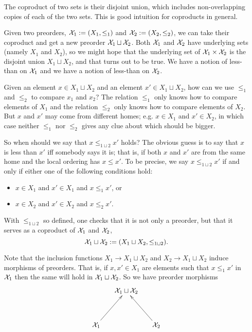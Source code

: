 \documentclass[CT4S-EN-RU]{subfiles}
\begin{document}
\begin{exampleRUS}\label{ex:[1]x[1]}
\end{exampleRUS}


\subsubsection{}

\begin{blockENG}
The coproduct of two sets is their disjoint union, which includes non-overlapping copies of each of the two sets. This is good intuition for coproducts in general.
\end{blockENG}

\begin{blockRUS}
\end{blockRUS}

\begin{exampleENG}
Given two preorders, $\mathcal{X}_1:=(X_1,\leq_1)$ and $\mathcal{X}_2:=(X_2,\leq_2)$, we can take their coproduct and get a new preorder $\mathcal{X}_1\sqcup\mathcal{X}_2$. Both $\mathcal{X}_1$ and $\mathcal{X}_2$ have underlying sets (namely $X_1$ and $X_2$), so we might hope that the underlying set of $\mathcal{X}_1\times\mathcal{X}_2$ is the disjoint union $X_1\sqcup X_2$, and that turns out to be true. We have a notion of less-than on $\mathcal{X}_1$ and we have a notion of less-than on $\mathcal{X}_2$. 

Given an element $x\in X_1\sqcup X_2$ and an element $x'\in X_1\sqcup X_2$, how can we use $\leq_1$ and $\leq_2$ to compare $x_1$ and $x_2$? The relation $\leq_1$ only knows how to compare elements of $X_1$ and the relation $\leq_2$ only knows how to compare elements of $X_2$. But $x$ and $x'$ may come from different homes; e.g. $x\in X_1$ and $x'\in X_2$, in which case neither $\leq_1$ nor $\leq_2$ gives any clue about which should be bigger. 

So when should we say that $x\leq_{1\sqcup 2} x'$ holds? The obvious guess is to say that $x$ is less than $x'$ iff somebody says it is; that is, if both $x$ and $x'$ are from the same home and the local ordering has $x\leq x'$. To be precise, we say $x\leq_{1\sqcup 2}x'$ if and only if either one of the following conditions hold:
\begin{itemize}
\item $x\in X_1$ and $x'\in X_1$ and $x\leq_1x'$, or
\item $x\in X_2$ and $x'\in X_2$ and $x\leq_2x'$.
\end{itemize}
With $\leq_{1\sqcup 2}$ so defined, one checks that it is not only a preorder, but that it serves as a coproduct of $\mathcal{X}_1$ and $\mathcal{X}_2$, 
$$\mathcal{X}_1\sqcup\mathcal{X}_2:=(X_1\sqcup X_2,\leq_{1\sqcup 2}).$$

Note that the inclusion functions $X_1\to X_1\sqcup X_2$ and $X_2\to X_1\sqcup X_2$ induce morphisms of preorders. That is, if $x,x'\in X_1$ are elements such that $x\leq_1x'$ in $\mathcal{X}_1$ then the same will hold in $\mathcal{X}_1\sqcup\mathcal{X}_2$. So we have preorder morphisms
$$\xymatrix@=15pt{&\mcX_1\sqcup\mcX_2\\\\\mcX_1\ar[ruu]&&\mcX_2\ar[luu]}$$
\end{exampleENG}
\end{document}
